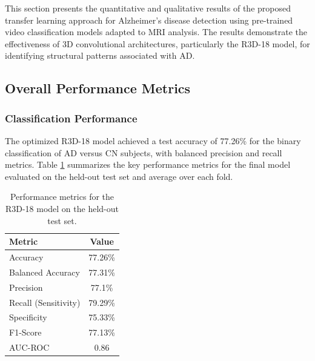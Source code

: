\documentclass[12pt, a4paper]{article}
\begin{document}




This section presents the quantitative and qualitative results of the proposed transfer learning approach for Alzheimer's disease detection using pre-trained video classification models adapted to MRI analysis. The results demonstrate the effectiveness of 3D convolutional architectures, particularly the R3D-18 model, for identifying structural patterns associated with AD.

\subsection{Overall Performance Metrics}

\subsubsection{Classification Performance}

The optimized R3D-18 model achieved a test accuracy of 77.26\% for the binary classification of AD versus CN subjects, with balanced precision and recall metrics. Table \ref{tab:performance_metrics} summarizes the key performance metrics for the final model evaluated on the held-out test set and average over each fold.

\begin{table}[htbp]
\centering
\begin{tabular}{|l|c|}
\hline
\textbf{Metric} & \textbf{Value} \\
\hline
Accuracy & 77.26\% \\
Balanced Accuracy & 77.31\% \\
Precision & 77.1\% \\
Recall (Sensitivity) & 79.29\% \\
Specificity & 75.33\% \\
F1-Score & 77.13\% \\
AUC-ROC & 0.86 \\
\hline
\end{tabular}
\caption{Performance metrics for the R3D-18 model on the held-out test set.}
\label{tab:performance_metrics}
\end{table}
\end{document}
